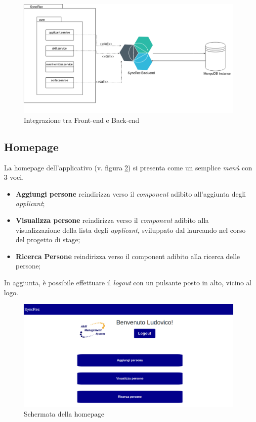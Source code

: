 \begin{figure}[!h] 
	\centering 
	\includegraphics[width=1\columnwidth]{immagini/usecase/UML2} 
	\caption{Integrazione tra Front-end e Back-end}
	\label{figura:UML2}
\end{figure}

\subsection{Homepage}
La homepage dell'applicativo (v. figura \ref{figura:homepage}) si presenta come un semplice \textit{menù} con 3 voci.
\begin{itemize}
	\item \textbf{Aggiungi persone} reindirizza verso il \textit{component} adibito all'aggiunta degli \textit{applicant};
	\item \textbf{Visualizza persone} reindirizza verso il \textit{component} adibito alla visualizzazione della lista degli \textit{applicant}, sviluppato dal laureando nel corso del progetto di stage;
	\item \textbf{Ricerca Persone} reindirizza verso il component adibito alla ricerca delle persone;
\end{itemize}
In aggiunta, è possibile effettuare il \textit{logout} con un pulsante posto in alto, vicino al logo.
\vspace{0.5em}
\begin{figure}[!h] 
	\centering 
	\includegraphics[width=1\columnwidth]{immagini/svil/homepage} 
	\caption{Schermata della homepage}
	\label{figura:homepage}
\end{figure}

